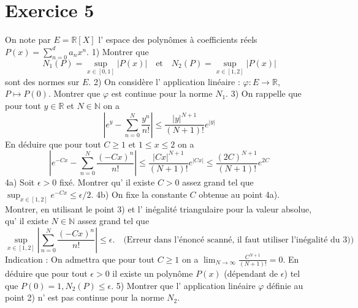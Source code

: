 \documentclass{article}
\begin{document}
\section*{Exercice 5}
On note par $E = \mathbb{R}[X]$ l' espace des polynômes à coefficients réels $P(x) = \sum_{n=0}^d a_n x^n$.
1) Montrer que
\[ N_1(P) = \sup_{x \in [0,1]} |P(x)| \quad \text{et} \quad N_2(P) = \sup_{x \in [1,2]} |P(x)| \]
sont des normes sur $E$.
2) On considère l' application linéaire : $\varphi: E \to \mathbb{R}$, $P \mapsto P(0)$. Montrer que $\varphi$ est continue pour la norme $N_1$.
3) On rappelle que pour tout $y \in \mathbb{R}$ et $N \in \mathbb{N}$ on a
\[ |e^y - \sum_{n=0}^N \frac{y^n}{n!}| \le \frac{|y|^{N+1}}{(N+1)!} e^{|y|} \]
En déduire que pour tout $C \ge 1$ et $1 \le x \le 2$ on a
\[ |e^{-Cx} - \sum_{n=0}^N \frac{(-Cx)^n}{n!}| \le \frac{|Cx|^{N+1}}{(N+1)!} e^{|Cx|} \le \frac{(2C)^{N+1}}{(N+1)!} e^{2C} \]
4a) Soit $\epsilon > 0$ fixé. Montrer qu' il existe $C > 0$ assez grand tel que $\sup_{x \in [1,2]} e^{-Cx} \le \epsilon/2$.
4b) On fixe la constante $C$ obtenue au point 4a). Montrer, en utilisant le point 3) et l' inégalité triangulaire pour la valeur absolue, qu' il existe $N \in \mathbb{N}$ assez grand tel que
\[ \sup_{x \in [1,2]} |\sum_{n=0}^N \frac{(-Cx)^n}{n!}| \le \epsilon. \quad \text{(Erreur dans l'énoncé scanné, il faut utiliser l'inégalité du 3))} \]
Indication : On admettra que pour tout $C \ge 1$ on a $\lim_{N \to \infty} \frac{C^{N+1}}{(N+1)!} = 0$.
En déduire que pour tout $\epsilon > 0$ il existe un polynôme $P(x)$ (dépendant de $\epsilon$) tel que $P(0)=1, N_2(P) \le \epsilon$.
5) Montrer que l' application linéaire $\varphi$ définie au point 2) n' est pas continue pour la norme $N_2$.
\end{document}
